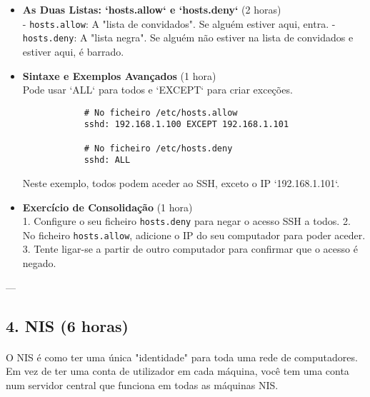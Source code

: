 \documentclass[10pt,a4paper]{article}
\begin{document}
	\begin{itemize}
		\item \textbf{As Duas Listas: `hosts.allow` e `hosts.deny`} (2 horas) \\
		- \texttt{hosts.allow}: A "lista de convidados". Se alguém estiver aqui, entra.
		- \texttt{hosts.deny}: A "lista negra". Se alguém não estiver na lista de convidados e estiver aqui, é barrado.
		
		\item \textbf{Sintaxe e Exemplos Avançados} (1 hora) \\
		Pode usar `ALL` para todos e `EXCEPT` para criar exceções.
		\begin{verbatim}
			# No ficheiro /etc/hosts.allow
			sshd: 192.168.1.100 EXCEPT 192.168.1.101
			
			# No ficheiro /etc/hosts.deny
			sshd: ALL
		\end{verbatim}
		Neste exemplo, todos podem aceder ao SSH, exceto o IP `192.168.1.101`.
		
		\item \textbf{Exercício de Consolidação} (1 hora) \\
		1. Configure o seu ficheiro \texttt{hosts.deny} para negar o acesso SSH a todos.
		2. No ficheiro \texttt{hosts.allow}, adicione o IP do seu computador para poder aceder.
		3. Tente ligar-se a partir de outro computador para confirmar que o acesso é negado.
	\end{itemize}
	
	---
	
	\subsection*{4. NIS (6 horas)}
	\vspace{-1.2em}
	\paragraph{}
	O NIS é como ter uma única "identidade" para toda uma rede de computadores. Em vez de ter uma conta de utilizador em cada máquina, você tem uma conta num servidor central que funciona em todas as máquinas NIS.
	
\end{document}
